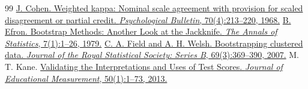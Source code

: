 \documentclass[cameraready]{Interspeech}
\begin{document}
\begin{thebibliography}{99}
 \href{https://doi.org/10.1037/h0026256}{J. Cohen. Weighted kappa: Nominal scale agreement with provision for scaled disagreement or partial credit. \textit{Psychological Bulletin}, 70(4):213--220, 1968.}
 \href{https://doi.org/10.1214/aos/1176344552}{B. Efron. Bootstrap Methods: Another Look at the Jackknife. \textit{The Annals of Statistics}, 7(1):1--26, 1979.}
 \href{https://doi.org/10.1111/j.1467-9868.2007.00593.x}{C. A. Field and A. H. Welsh. Bootstrapping clustered data. \textit{Journal of the Royal Statistical Society: Series B}, 69(3):369--390, 2007.}
 M. T. Kane. \href{https://doi.org/10.1111/jedm.12000}{Validating the Interpretations and Uses of Test Scores. \textit{Journal of Educational Measurement}, 50(1):1--73, 2013.}
\end{thebibliography}
\end{document}

